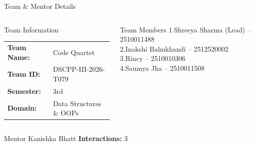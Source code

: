\documentclass[aspectratio=169,11pt]{beamer}
\begin{document}
\begin{frame}{Team \& Mentor Details}

\begin{columns}[T,totalwidth=\textwidth]


\begin{block}{Team Information}
\begin{tabular}{@{}ll@{}}
\textbf{Team Name:} & Code Quartet\\
\textbf{Team ID:} & DSCPP-III-2026-T079\\
\textbf{Semester:} & 3rd\\
\textbf{Domain:} & Data Structures \& OOPs
\end{tabular}
\end{block}


\begin{block}{Team Members}
\small
1.\quad Shreeya Sharma (Lead) -- 2510011488\\
2.\quad Inakshi Bahukhandi -- 2512520002\\
3.\quad Rincy -- 2510010306\\
4.\quad Saumya Jha -- 2510011508
\end{block}

\end{columns}

\vspace{2mm}

\begin{block}{Mentor}
Kanishka Bhatt
\hfill
\textbf{Interactions:} 3
\end{block}

\end{frame}
\end{document}
